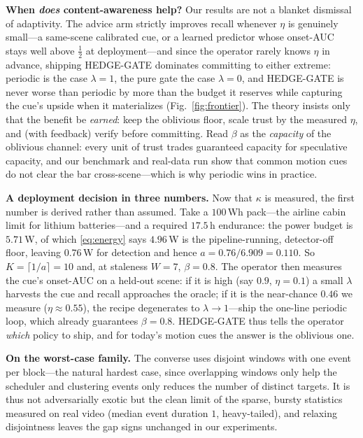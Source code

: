 ﻿\documentclass[lettersize,journal]{IEEEtran}
\begin{document}
\textbf{When \emph{does} content-awareness help?} Our results are not a blanket dismissal of adaptivity. The advice arm strictly improves recall whenever $\eta$ is genuinely small---a same-scene calibrated cue, or a learned predictor whose onset-AUC stays well above $\tfrac12$ at deployment---and since the operator rarely knows $\eta$ in advance, shipping HEDGE-GATE dominates committing to either extreme: periodic is the case $\lambda{=}1$, the pure gate the case $\lambda{=}0$, and HEDGE-GATE is never worse than periodic by more than the budget it reserves while capturing the cue's upside when it materializes (Fig.~\ref{fig:frontier}). The theory insists only that the benefit be \emph{earned}: keep the oblivious floor, scale trust by the measured $\eta$, and (with feedback) verify before committing. Read $\beta$ as the \emph{capacity} of the oblivious channel: every unit of trust trades guaranteed capacity for speculative capacity, and our benchmark and real-data run show that common motion cues do not clear the bar cross-scene---which is why periodic wins in practice.

\textbf{A deployment decision in three numbers.} Now that $\kappa$ is measured, the first number is derived rather than assumed. Take a $100$\,Wh pack---the airline cabin limit for lithium batteries---and a required $17.5$\,h endurance: the power budget is $5.71$\,W, of which \eqref{eq:energy} says $4.96$\,W is the pipeline-running, detector-off floor, leaving $0.76$\,W for detection and hence $a=0.76/6.909=0.110$. So $K=\lceil1/a\rceil=10$ and, at staleness $W{=}7$, $\beta{=}0.8$. The operator then measures the cue's onset-AUC on a held-out scene: if it is high (say $0.9$, $\eta{=}0.1$) a small $\lambda$ harvests the cue and recall approaches the oracle; if it is the near-chance $0.46$ we measure ($\eta{\approx}0.55$), the recipe degenerates to $\lambda{\to}1$---ship the one-line periodic loop, which already guarantees $\beta{=}0.8$. HEDGE-GATE thus tells the operator \emph{which} policy to ship, and for today's motion cues the answer is the oblivious one.

\textbf{On the worst-case family.} The converse uses disjoint windows with one event per block---the natural hardest case, since overlapping windows only help the scheduler and clustering events only reduces the number of distinct targets. It is thus not adversarially exotic but the clean limit of the sparse, bursty statistics measured on real video (median event duration $1$, heavy-tailed), and relaxing disjointness leaves the gap signs unchanged in our experiments.
\end{document}
